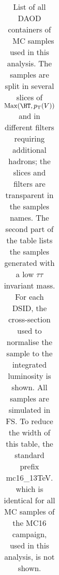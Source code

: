 \begin{table}[htbp]
{\begin{tabular}{l|r}
\bottomrule
\end{tabular}}
  \caption{
    List of all DAOD containers of \Ztt\ \sherpa\ MC samples used in this analysis.
    The samples are split in several slices of $\mathrm{Max}(\HT,\pT(V))$ and in different filters requiring additional hadrons;
    the slices and filters are transparent in the samples names.
    The second part of the table lists the samples generated with a low $\tau\tau$ invariant mass.
    For each DSID, the cross-section used to normalise the sample to the integrated luminosity is shown.
    All samples are simulated in FS.
    To reduce the width of this table, the standard prefix \textsf{mc16\_13TeV.} which is identical for all MC samples of the MC16 campaign, used in this analysis, is not shown.
  }
  \label{tab:MC_samples_Ztautau}
\end{table}




